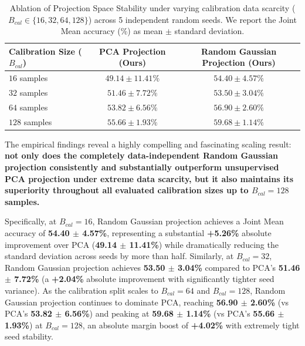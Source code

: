 \begin{table}[h]
\caption{Ablation of Projection Space Stability under varying calibration data scarcity ($B_{cal} \in \{16, 32, 64, 128\}$) across 5 independent random seeds. We report the Joint Mean accuracy (\%) as mean $\pm$ standard deviation.}
\label{tab:projection_ablation}
\vskip 0.15in
\begin{center}
\begin{small}
\begin{sc}
\begin{tabular}{lcc}
\toprule
Calibration Size ($B_{cal}$) & PCA Projection (Ours) & Random Gaussian Projection (Ours) \\
\midrule
$16$ samples & $49.14 \pm 11.41\%$ & $\mathbf{54.40 \pm 4.57\%}$ \\
$32$ samples & $51.46 \pm 7.72\%$ & $\mathbf{53.50 \pm 3.04\%}$ \\
$64$ samples & $53.82 \pm 6.56\%$ & $\mathbf{56.90 \pm 2.60\%}$ \\
$128$ samples & $55.66 \pm 1.93\%$ & $\mathbf{59.68 \pm 1.14\%}$ \\
\bottomrule
\end{tabular}
\end{sc}
\end{small}
\end{center}
\vskip -0.1in
\end{table}

The empirical findings reveal a highly compelling and fascinating scaling result: \textbf{not only
does the completely data-independent Random Gaussian projection consistently and substantially
outperform unsupervised PCA projection under extreme data scarcity, but it also maintains its
superiority throughout all evaluated calibration sizes up to $B_{cal}=128$ samples.}

Specifically, at $B_{cal}=16$, Random Gaussian projection achieves a Joint Mean accuracy of
\textbf{54.40 $\pm$ 4.57\%}, representing a substantial \textbf{+5.26\%} absolute improvement over
PCA (\textbf{49.14 $\pm$ 11.41\%}) while dramatically reducing the standard deviation across seeds
by more than half. Similarly, at $B_{cal}=32$, Random Gaussian projection achieves \textbf{53.50
$\pm$ 3.04\%} compared to PCA's \textbf{51.46 $\pm$ 7.72\%} (a \textbf{+2.04\%} absolute improvement
with significantly tighter seed variance). As the calibration split scales to $B_{cal}=64$ and
$B_{cal}=128$, Random Gaussian projection continues to dominate PCA, reaching \textbf{56.90 $\pm$
2.60\%} (vs PCA's \textbf{53.82 $\pm$ 6.56\%}) and peaking at \textbf{59.68 $\pm$ 1.14\%} (vs PCA's
\textbf{55.66 $\pm$ 1.93\%}) at $B_{cal}=128$, an absolute margin boost of \textbf{+4.02\%} with
extremely tight seed stability.


